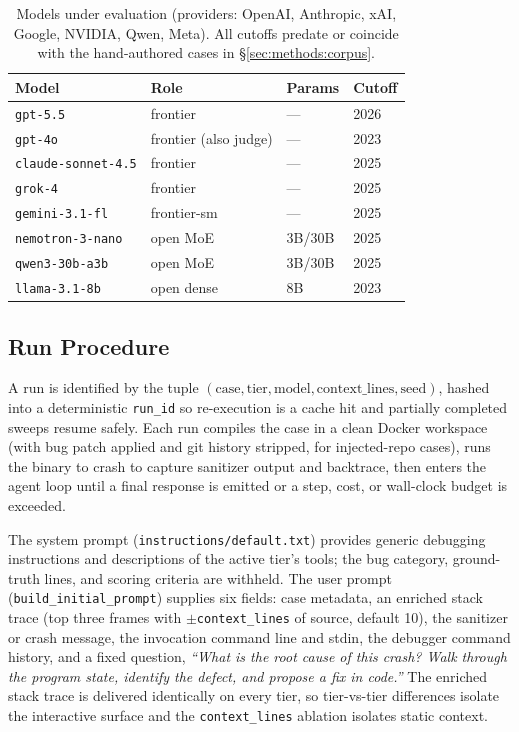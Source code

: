 \documentclass[11pt]{article}
\begin{document}
\begin{table}[t]
    \centering
    \footnotesize
    \setlength{\tabcolsep}{4pt}
    \begin{tabular}{@{}llll@{}}
        \toprule
        Model & Role & Params & Cutoff \\
        \midrule
        \texttt{gpt-5.5} & frontier & --- & 2026 \\
        \texttt{gpt-4o} & frontier (also judge) & --- & 2023 \\
        \texttt{claude-sonnet-4.5} & frontier & --- & 2025 \\
        \texttt{grok-4} & frontier & --- & 2025 \\
        \texttt{gemini-3.1-fl} & frontier-sm & --- & 2025 \\
        \texttt{nemotron-3-nano} & open MoE & 3B/30B & 2025 \\
        \texttt{qwen3-30b-a3b} & open MoE & 3B/30B & 2025 \\
        \texttt{llama-3.1-8b} & open dense & 8B & 2023 \\
        \bottomrule
    \end{tabular}
    \caption{Models under evaluation (providers: OpenAI, Anthropic, xAI, Google, NVIDIA, Qwen, Meta). All cutoffs predate or coincide with the hand-authored cases in \S\ref{sec:methods:corpus}.}
    \label{tab:models}
\end{table}

\subsection{Run Procedure}
\label{sec:methods:loop}

A run is identified by the tuple $(\text{case}, \text{tier}, \text{model}, \text{context\_lines}, \text{seed})$, hashed into a deterministic \texttt{run\_id} so re-execution is a cache hit and partially completed sweeps resume safely. Each run compiles the case in a clean Docker workspace (with bug patch applied and git history stripped, for injected-repo cases), runs the binary to crash to capture sanitizer output and backtrace, then enters the agent loop until a final response is emitted or a step, cost, or wall-clock budget is exceeded.

The system prompt (\texttt{instructions/default.txt}) provides generic debugging instructions and descriptions of the active tier's tools; the bug category, ground-truth lines, and scoring criteria are withheld. The user prompt (\texttt{build\_initial\_prompt}) supplies six fields: case metadata, an enriched stack trace (top three frames with $\pm$\texttt{context\_lines} of source, default 10), the sanitizer or crash message, the invocation command line and stdin, the debugger command history, and a fixed question, \emph{``What is the root cause of this crash? Walk through the program state, identify the defect, and propose a fix in code.''} The enriched stack trace is delivered identically on every tier, so tier-vs-tier differences isolate the interactive surface and the \texttt{context\_lines} ablation isolates static context.
\end{document}
